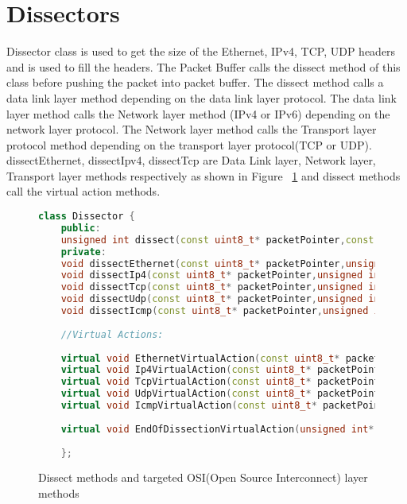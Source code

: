 \section{Dissectors}
Dissector class is used to get the size of the Ethernet, IPv4, TCP, UDP headers and is used to fill the headers. The Packet Buffer calls the dissect method of this class before pushing the packet into packet buffer. The dissect method calls a data link layer method depending on the data link layer protocol. The data link layer method calls the Network layer method (IPv4 or IPv6) depending on the network layer protocol. The Network layer method calls the Transport layer protocol method depending on the transport layer protocol(TCP or UDP). dissectEthernet, dissectIpv4, dissectTcp are Data Link layer, Network layer, Transport layer methods respectively as shown in Figure ~\ref{fig:calldissectmethods} and dissect methods call the virtual action methods.

\begin{figure}
	\centering
\begin{lstlisting}[frame=none,language=C++] 
	class Dissector {
	public:
	unsigned int dissect(const uint8_t* packetPointer,const struct pcap_pkthdr* hdr,const int deviceDataLinkInfo,void* user);
	private:
	void dissectEthernet(const uint8_t* packetPointer,unsigned int * totalHeaderLength,const struct pcap_pkthdr* hdr,void* user);
	void dissectIp4(const uint8_t* packetPointer,unsigned int * totalHeaderLength,const struct pcap_pkthdr* hdr,void* user);
	void dissectTcp(const uint8_t* packetPointer,unsigned int * totalHeaderLength,const struct pcap_pkthdr* hdr,void* user);
	void dissectUdp(const uint8_t* packetPointer,unsigned int * totalHeaderLength,const struct pcap_pkthdr* hdr,void* user);
	void dissectIcmp(const uint8_t* packetPointer,unsigned int * totalHeaderLength,const struct pcap_pkthdr* hdr,void* user);
	
	//Virtual Actions:
	
	virtual void EthernetVirtualAction(const uint8_t* packetPointer,unsigned int* totalHeaderLength,const struct pcap_pkthdr* hdr,Ethernet2Header* header,void* user)=0;
	virtual void Ip4VirtualAction(const uint8_t* packetPointer,unsigned int* totalHeaderLength,const struct pcap_pkthdr* hdr,Ip4Header* header,void* user)=0;
	virtual void TcpVirtualAction(const uint8_t* packetPointer,unsigned int* totalHeaderLength,const struct pcap_pkthdr* hdr,TcpHeader* header,void* user)=0;
	virtual void UdpVirtualAction(const uint8_t* packetPointer,unsigned int* totalHeaderLength,const struct pcap_pkthdr* hdr,UdpHeader* header,void* user)=0;
	virtual void IcmpVirtualAction(const uint8_t* packetPointer,unsigned int* totalHeaderLength,const struct pcap_pkthdr* hdr,IcmpHeader* header,void* user)=0;
	
	virtual void EndOfDissectionVirtualAction(unsigned int* totalHeaderLength,const struct pcap_pkthdr* hdr,void* user)=0;
	
	};
\end{lstlisting}
	\caption{Dissect methods and targeted OSI(Open Source Interconnect) layer methods \cite{bib3}}
	\label{fig:calldissectmethods}
\end{figure}

